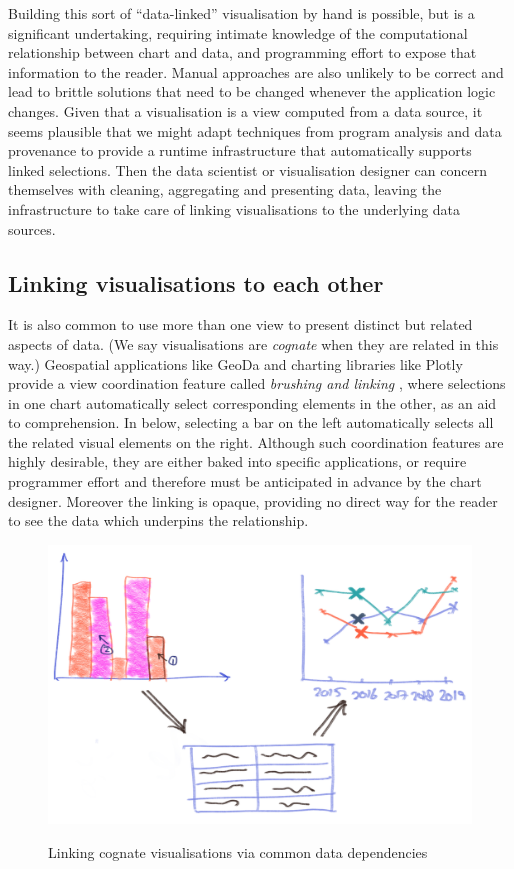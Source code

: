Building this sort of ``data-linked'' visualisation by hand is possible, but is a significant undertaking, requiring intimate knowledge of the computational relationship between chart and data, and programming effort to expose that information to the reader. Manual approaches are also unlikely to be correct and lead to brittle solutions that need to be changed whenever the application logic changes. Given that a visualisation is a view computed from a data source, it seems plausible that we might adapt techniques from program analysis and data provenance to provide a runtime infrastructure that automatically supports linked selections. Then the data scientist or visualisation designer can concern themselves with cleaning, aggregating and presenting data, leaving the infrastructure to take care of linking visualisations to the underlying data sources.

\subsection{Linking visualisations to each other}

It is also common to use more than one view to present distinct but related aspects of data. (We say visualisations are \emph{cognate} when they are related in this way.) Geospatial applications like GeoDa \cite{anselin06} and charting libraries like Plotly provide a view coordination feature called \emph{brushing and linking} \cite{becker87}, where selections in one chart automatically select corresponding elements in the other, as an aid to comprehension. In  below, selecting a bar on the left automatically selects all the related visual elements on the right. Although such coordination features are highly desirable, they are either baked into specific applications, or require programmer effort and therefore must be anticipated in advance by the chart designer. Moreover the linking is opaque, providing no direct way for the reader to see the data which underpins the relationship.

\begin{figure}[H]
   {\includegraphics[scale=0.14]{fig/example/vis-linking.png}}
   \caption{Linking cognate visualisations via common data dependencies}
   \label{fig:introduction:vis-linking}
\end{figure}

